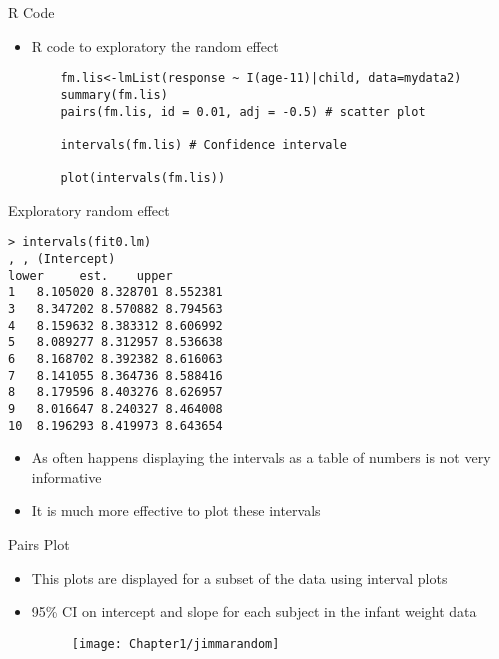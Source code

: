 \documentclass{beamer}
\begin{document}
\begin{frame}[fragile]{R Code}
\begin{itemize}
	\item R code to exploratory the random effect
	\begin{verbatim}
	fm.lis<-lmList(response ~ I(age-11)|child, data=mydata2)
	summary(fm.lis)
	pairs(fm.lis, id = 0.01, adj = -0.5) # scatter plot
	
	intervals(fm.lis) # Confidence intervale 

	plot(intervals(fm.lis))
	\end{verbatim}
\end{itemize}
\end{frame}

\begin{frame}[fragile]{Exploratory random effect}
	\begin{verbatim}
> intervals(fit0.lm)
, , (Intercept)
lower     est.    upper
1   8.105020 8.328701 8.552381
3   8.347202 8.570882 8.794563
4   8.159632 8.383312 8.606992
5   8.089277 8.312957 8.536638
6   8.168702 8.392382 8.616063
7   8.141055 8.364736 8.588416
8   8.179596 8.403276 8.626957
9   8.016647 8.240327 8.464008
10  8.196293 8.419973 8.643654
\end{verbatim}
\begin{itemize}
	\item As often happens displaying the intervals as a table of numbers is not very informative
	\item It is much more effective to plot these intervals
\end{itemize}
\end{frame}


\begin{frame}{Pairs Plot}
\begin{itemize}
\item This plots are displayed for a subset of	the data using interval plots
\item 95\% CI on intercept and slope for each subject in the infant weight data
\begin{figure}[h!]
	\centering
	\texttt{[image: Chapter1/jimmarandom]}
\end{figure}
\end{itemize}
\end{frame}
\end{document}
